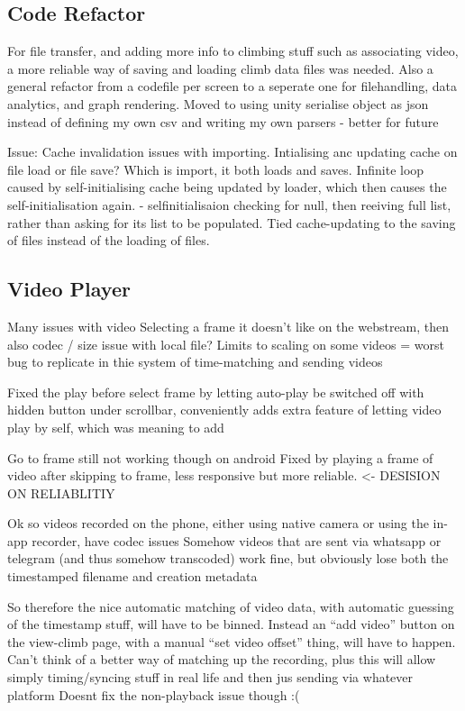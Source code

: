 \subsection{Code Refactor}
For file transfer, and adding more info to climbing stuff such as associating video, a more reliable way of saving and loading climb data files was needed.
Also a general refactor from a codefile per screen to a seperate one for filehandling, data analytics, and graph rendering.
Moved to using unity serialise object as json instead of defining my own csv and writing my own parsers - better for future


Issue: Cache invalidation issues with importing. Intialising anc updating cache on file load or file save? Which is import, it both loads and saves.
Infinite loop caused by self-initialising cache being updated by loader, which then causes the self-initialisation again. - selfinitialisaion checking for null, then reeiving full list, rather than asking for its list to be populated. Tied cache-updating to the saving of files instead of the loading of files.




\subsection{Video Player}

Many issues with video
Selecting a frame it doesn’t like on the webstream, then also codec / size issue with local file?
Limits to scaling on some videos = worst bug to replicate in thie system of time-matching and sending videos

Fixed the play before select frame by letting auto-play be switched off with hidden button under scrollbar, conveniently adds extra feature of letting video play by self, which was meaning to add

Go to frame still not working though on android
Fixed by playing a frame of video after skipping to frame, less responsive but more reliable. <- DESISION ON RELIABLITIY




Ok so videos recorded on the phone, either using native camera or using the in-app recorder, have codec issues
Somehow videos that are sent via whatsapp or telegram (and thus somehow transcoded) work fine, but obviously lose both the timestamped filename and creation metadata


So therefore the nice automatic matching of video data, with automatic guessing of the timestamp stuff, will have to be binned.
Instead an “add video” button on the view-climb page, with a manual “set video offset” thing, will have to happen.
Can’t think of a better way of matching up the recording, plus this will allow simply timing/syncing stuff in real life and then jus sending via whatever platform
Doesnt fix the non-playback issue though :(


